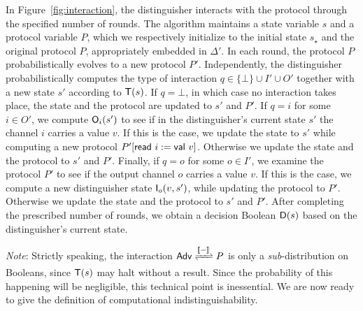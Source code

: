 In Figure~\ref{fig:interaction}, the distinguisher interacts with the protocol through the specified number of rounds. The algorithm maintains a state variable $s$ and a protocol variable $P$, which we respectively initialize to the initial state $s_\star$ and the original protocol $P$, appropriately embedded in $\Delta'$. In each round, the protocol $P$ probabilistically evolves to a new protocol $P'$. Independently, the distinguisher probabilistically computes the type of interaction $q \in \{\bot\} \cup I' \cup O'$ together with a new state $s'$ according to $\mathsf{T}(s)$. If $q = \bot$, in which case no interaction takes place, the state and the protocol are updated to $s'$ and $P'$. If $q = i$ for some $i \in O'$, we compute $\mathsf{O}_i(s')$ to see if in the distinguisher's current state $s'$ the channel $i$ carries a value $v$. If this is the case, we update the state to $s'$ while computing a new protocol $P'[\mathsf{read} \ i := \mathsf{val} \ v]$. Otherwise we update the state and the protocol to $s'$ and $P'$. Finally, if $q = o$ for some $o \in I'$, we examine the protocol $P'$ to see if the output channel $o$ carries a value $v$. If this is the case, we compute a new distinguisher state $\mathsf{I}_o(v,s')$, while updating the protocol to $P'$. Otherwise we update the state and the protocol to $s'$ and $P'$. After completing the prescribed number of rounds, we obtain a decision Boolean $\mathsf{D}(s)$ based on the distinguisher's current state.

\emph{Note}: Strictly speaking, the interaction $\interaction{\Adv}{P}{\int{-}}$ is only a \emph{sub}-distribution on Booleans, since $\mathsf{T}(s)$ may halt without a result. Since the probability of this happening will be negligible, this technical point is inessential. We are now ready to give the definition of computational indistinguishability.

